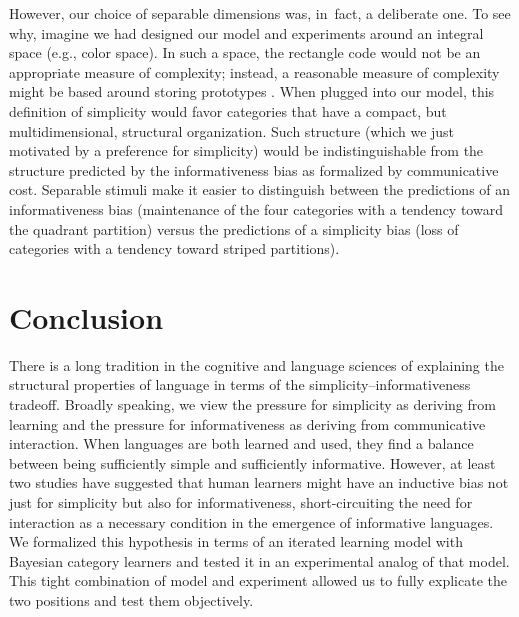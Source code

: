 \documentclass[doc,biblatex]{apa7}
\begin{document}
However, our choice of separable dimensions was, in~fact, a deliberate one. To see why, imagine we had designed our model and experiments around an integral space (e.g., color space). In such a space, the rectangle code would not be an appropriate measure of complexity; instead, a reasonable measure of complexity might be based around storing prototypes \parencite[see e.g.,][for an example of such an approach]{Pothos:2009}. When plugged into our model, this definition of simplicity would favor categories that have a compact, but multidimensional, structural organization. Such structure (which we just motivated by a preference for simplicity) would be indistinguishable from the structure predicted by the informativeness bias as formalized by communicative cost. Separable stimuli make it easier to distinguish between the predictions of an informativeness bias (maintenance of the four categories with a tendency toward the quadrant partition) versus the predictions of a simplicity bias (loss of categories with a tendency toward striped partitions).

\section{Conclusion}

There is a long tradition in the cognitive and language sciences of explaining the structural properties of language in terms of the simplicity--informativeness tradeoff. Broadly speaking, we view the pressure for simplicity as deriving from learning and the pressure for informativeness as deriving from communicative interaction. When languages are both learned and used, they find a balance between being sufficiently simple and sufficiently informative. However, at least two studies \parencite{Carstensen:2015,Fedzechkina:2012} have suggested that human learners might have an inductive bias not just for simplicity but also for informativeness, short-circuiting the need for interaction as a necessary condition in the emergence of informative languages. We formalized this hypothesis in terms of an iterated learning model with Bayesian category learners and tested it in an experimental analog of that model. This tight combination of model and experiment allowed us to fully explicate the two positions and test them objectively.
\end{document}
